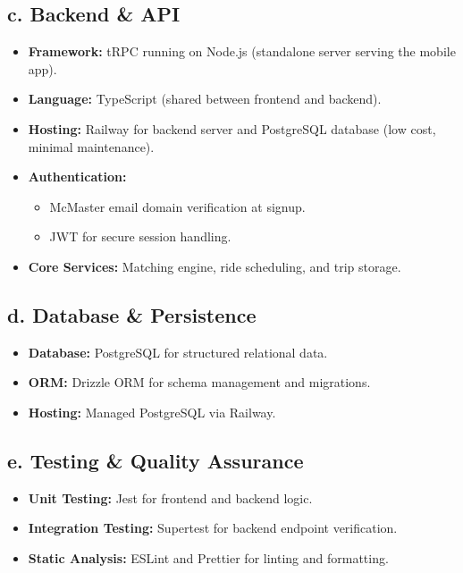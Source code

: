 \documentclass{article}
\begin{document}
\subsection*{c. Backend \& API}
\begin{itemize}
    \item \textbf{Framework:} tRPC running on Node.js (standalone server serving the mobile app).
    \item \textbf{Language:} TypeScript (shared between frontend and backend).
    \item \textbf{Hosting:} Railway for backend server and PostgreSQL database (low cost, minimal maintenance).
    \item \textbf{Authentication:} 
    \begin{itemize}
        \item McMaster email domain verification at signup.
        \item JWT for secure session handling.
    \end{itemize}
    \item \textbf{Core Services:} Matching engine, ride scheduling, and trip storage.
\end{itemize}

\subsection*{d. Database \& Persistence}
\begin{itemize}
    \item \textbf{Database:} PostgreSQL for structured relational data.
    \item \textbf{ORM:} Drizzle ORM for schema management and migrations.
    \item \textbf{Hosting:} Managed PostgreSQL via Railway.
\end{itemize}

\subsection*{e. Testing \& Quality Assurance}
\begin{itemize}
    \item \textbf{Unit Testing:} Jest for frontend and backend logic.
    \item \textbf{Integration Testing:} Supertest for backend endpoint verification.
    \item \textbf{Static Analysis:} ESLint and Prettier for linting and formatting.
\end{itemize}
\end{document}
